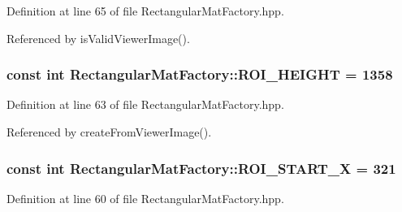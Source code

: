 \-Definition at line 65 of file \-Rectangular\-Mat\-Factory.\-hpp.



\-Referenced by is\-Valid\-Viewer\-Image().

\hypertarget{classmultiscale_1_1analysis_1_1RectangularMatFactory_a66855a873613668d15773b85efea9829}{
\subsubsection[{\-R\-O\-I\-\_\-\-H\-E\-I\-G\-H\-T}]{\setlength{\rightskip}{0pt plus 5cm}const int {\bf \-Rectangular\-Mat\-Factory\-::\-R\-O\-I\-\_\-\-H\-E\-I\-G\-H\-T} = 1358}}\label{classmultiscale_1_1analysis_1_1RectangularMatFactory_a66855a873613668d15773b85efea9829}


\-Definition at line 63 of file \-Rectangular\-Mat\-Factory.\-hpp.



\-Referenced by create\-From\-Viewer\-Image().

\hypertarget{classmultiscale_1_1analysis_1_1RectangularMatFactory_a90e622e964218af93ca0d024dc3faa41}{
\subsubsection[{\-R\-O\-I\-\_\-\-S\-T\-A\-R\-T\-\_\-\-X}]{\setlength{\rightskip}{0pt plus 5cm}const int {\bf \-Rectangular\-Mat\-Factory\-::\-R\-O\-I\-\_\-\-S\-T\-A\-R\-T\-\_\-\-X} = 321}}\label{classmultiscale_1_1analysis_1_1RectangularMatFactory_a90e622e964218af93ca0d024dc3faa41}


\-Definition at line 60 of file \-Rectangular\-Mat\-Factory.\-hpp.



